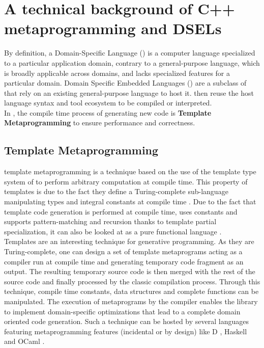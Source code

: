\documentclass[../main]{subfiles}
\begin{document}
\section{
  A technical background of C++ metaprogramming and DSELs
}

By definition, a Domain-Specific Language (\dsl) is a computer language
specialized to a particular application domain, contrary to a general-purpose
language, which is broadly applicable across domains, and lacks specialized
features for a particular domain. Domain Specific Embedded Languages (\dsels)
are a subclass of \dsl that rely on an existing general-purpose language to host
it. \dsels then reuse the host language syntax and tool ecosystem to be compiled
or interpreted.
\\

In \cpp, the compile time process of generating new code is
\textbf{Template Metaprogramming} to ensure performance and correctness.

\subsection{
  Template Metaprogramming
}

\cpp template metaprogramming \cite{abrahams:2004} is a technique based on the
use of the template type system of \cpp to perform arbitrary computation at
compile time. This property of \cpp templates is due to the fact they
define a Turing-complete sub-language manipulating types and integral constants
at compile time \cite{unruh:1994}. Due to the fact that template code generation
is performed at compile time, uses constants and supports pattern-matching and
recursion thanks to template partial specialization, it can also be looked
at as a pure functional language \cite{haeri:2012}.
\\

Templates are an interesting technique for generative programming. As they
are Turing-complete, one can design a set of template metaprograms acting as a
\dsl compiler run at compile time and generating temporary \cpp code fragment as
an output. The resulting temporary source code is then merged with the rest of
the source code and finally processed by the classic compilation process.
Through this technique, compile time constants, data structures and complete
functions can be manipulated. The execution of metaprograms by the compiler
enables the library to implement domain-specific optimizations that lead to a
complete domain oriented code generation. Such a technique can be hosted by
several languages featuring metaprogramming features (incidental or by design)
like D \cite{template:dlang}, Haskell \cite{sheard:2002} and
OCaml \cite{serot:2008}.
\end{document}
